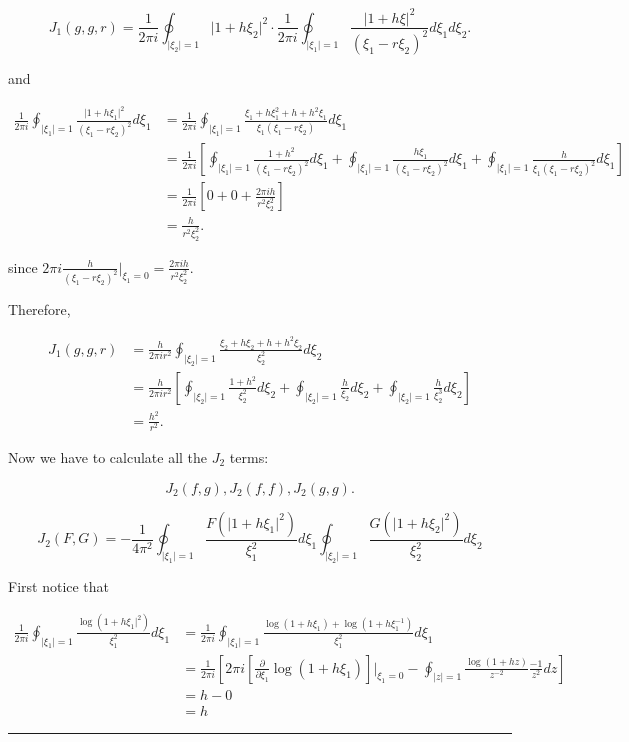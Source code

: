\documentclass[twoside]{article}
\newenvironment{proof}{{\bf Proof:}}{\hfill\rule{2mm}{2mm}}
\begin{document}
\begin{proof}
	
	$$J_1(g,g,r)=\frac{1}{2\pi i}\oint_{\lvert\xi_2\rvert=1}\lvert 1+h\xi_2\rvert^2\cdot \frac{1}{2\pi i}\oint_{\lvert\xi_1\rvert=1}\frac{\lvert 1+h\xi\rvert ^2}{(\xi_1-r\xi_2)^2}d\xi_1d\xi_2.$$
	
	and

\begin{equation}
	\begin{split}
		\frac{1}{2\pi i}\oint_{\lvert\xi_1\rvert=1}\frac{\lvert 1+h\xi_1\rvert^2}{(\xi_1-r\xi_2)^2}d\xi_1&=\frac{1}{2\pi i}\oint_{\lvert\xi_1\rvert=1}\frac{\xi_1+h\xi_1^2+h+h^2\xi_1}{\xi_1(\xi_1-r\xi_2)}d\xi_1\\
		&=\frac{1}{2\pi i}\left[\oint_{\lvert\xi_1\rvert=1}\frac{1+h^2}{(\xi_1-r\xi_2)^2}d\xi_1+\oint_{\lvert\xi_1\rvert=1}\frac{h\xi_1}{(\xi_1-r\xi_2)^2}d\xi_1+\oint_{\lvert\xi_1\rvert=1}\frac{h}{\xi_1(\xi_1-r\xi_2)^2}d\xi_1\right]\\
		&=\frac{1}{2\pi i}\left[0+0+\frac{2\pi ih}{r^2\xi_2^2}\right]\\
		&=\frac{h}{r^2\xi_2^2}.
	\end{split}
\end{equation}

since $2\pi i \frac{h}{(\xi_1-r\xi_2)^2}\Bigg\lvert_{\xi_1=0}=\frac{2\pi ih}{r^2\xi_2^2}$.

Therefore,

\begin{equation}
	\begin{split}
		J_1(g,g,r)&=\frac{h}{2\pi ir^2}\oint_{\lvert\xi_2\rvert=1}\frac{\xi_2+h\xi_2+h+h^2\xi_2}{\xi_2^2}d\xi_2\\
		&=\frac{h}{2\pi ir^2}\left[\oint_{\lvert\xi_2\rvert=1}\frac{1+h^2}{\xi_2^2}d\xi_2+\oint_{\lvert\xi_2\rvert=1}\frac{h}{\xi_2}d\xi_2+\oint_{\lvert\xi_2\rvert=1}\frac{h}{\xi_2^3}d\xi_2\right]\\
		&=\frac{h^2}{r^2}.
	\end{split}
\end{equation}

Now we have to calculate all the $J_2$ terms:

$$J_2(f,g), J_2(f,f), J_2(g,g).$$


$$J_2(F,G)=-\frac{1}{4\pi^2}\oint_{\lvert\xi_1\rvert=1}\frac{F(\lvert 1+h\xi_1\rvert^2)}{\xi_1^2}d\xi_1\oint_{\lvert\xi_2\rvert=1}\frac{G(\lvert 1+h\xi_2\rvert ^2)}{\xi_2^2}d\xi_2$$

First notice that

\begin{equation}
	\begin{split}
		\frac{1}{2\pi i}\oint_{\lvert\xi_1\rvert=1}\frac{\log(1+h\xi_1\rvert^2)}{\xi_1^2}d\xi_1&=\frac{1}{2\pi i}\oint_{\lvert\xi_1\rvert=1}\frac{\log(1+h\xi_1)+\log(1+h\xi_1^{-1})}{\xi_1^2}d\xi_1\\
		&=\frac{1}{2\pi i}\left[2\pi i\left[\frac{\partial}{\partial\xi_1}\log(1+h\xi_1)\right]\bigg\rvert_{\xi_1=0}-\oint_{\lvert z\rvert=1}\frac{\log(1+hz)}{z^{-2}}\frac{-1}{z^2}dz\right]\\
		&=h-0\\
		&=h
	\end{split}
\end{equation}


\end{proof}
\end{document}
